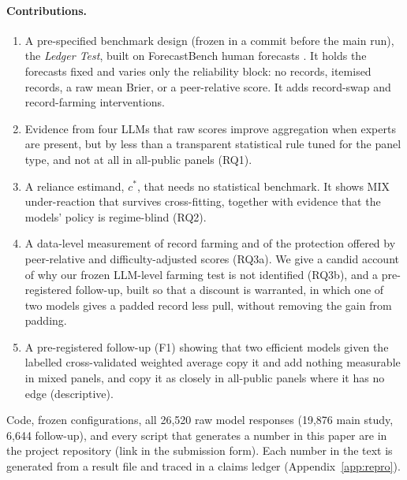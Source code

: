 \documentclass[11pt,letterpaper]{article}
\newcommand{\cstar}{c^{*}}
\begin{document}
\paragraph{Contributions.}
\begin{enumerate}
\item A pre-specified benchmark design (frozen in a commit before the main run), the \emph{Ledger Test}, built on ForecastBench human forecasts
  \citep{karger2025}. It holds the forecasts fixed and varies only the reliability block: no records, itemised records,
  a raw mean Brier, or a peer-relative score. It adds record-swap and record-farming interventions.
\item Evidence from four LLMs that raw scores improve aggregation when experts are present, but by less than a transparent
  statistical rule tuned for the panel type, and not at all in all-public panels (RQ1).
\item A reliance estimand, $\cstar$, that needs no statistical benchmark. It shows MIX under-reaction that survives cross-fitting, together with
  evidence that the models' policy is regime-blind (RQ2).
\item A data-level measurement of record farming and of the protection offered by peer-relative and difficulty-adjusted
  scores (RQ3a). We give a candid account of why our frozen LLM-level farming test is not identified (RQ3b), and a
  pre-registered follow-up, built so that a discount is warranted, in which one of two models gives a padded record
  less pull, without removing the gain from padding.
\item A pre-registered follow-up (F1) showing that two efficient models given the labelled cross-validated weighted
  average copy it and add nothing measurable in mixed panels, and copy it as closely in all-public panels where
  it has no edge (descriptive).
\end{enumerate}
Code, frozen configurations, all 26,520 raw model responses (19,876 main study, 6,644 follow-up), and every script that generates a number in this paper
are in the project repository (link in the submission form). Each number in the text is generated from a result file and traced in a claims ledger
(Appendix~\ref{app:repro}).
\end{document}

